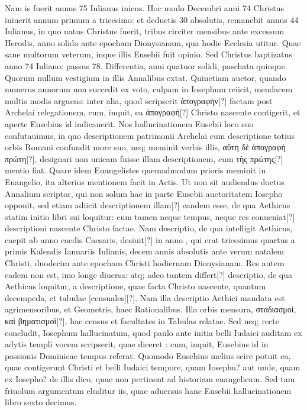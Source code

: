Nam is fuerit annus 75 Iulianus iniens.
Hoc modo Decembri anni 74 Christus iniuerit annum primum a tricesimo: et
deductis 30 absolutis, remanebit annus 44 Iulianus, in quo natus
Christus fuerit, tribus circiter mensibus ante excessum Herodis, anno
solido ante epocham Dionysianam, qua hodie Ecclesia utitur.
Quae sane multorum veterum, inque illis Eusebii fuit opinio.
Sed
Christus baptizatus anno 74 Iuliano: passus 78.
Differentia, anni
quatuor solidi, paschata quinque.
Quorum nullum vestigium in illis
Annalibus extat.
Quinetiam auctor, quando numerus annorum
non succedit ex voto, culpam in Iosephum reiicit, mendacem multis
modis arguens: inter alia, quod scripserit \textgreek{ἀπογραφὴν[?]} factam post
Archelai relegationem, cum, inquit, ea \textgreek{ἀπογραφὴ[?]} Christo nascente
contigerit, et aperte Eusebius id indicauerit.
Nos hallucinationem
Eusebii loco suo confutauimus, in quo descriptionem patrimonii
Archelai cum descriptione totius orbis Romani confundit more
suo, neq; meminit verbis illis, \textgreek{αὕτη δὲ ἀπογραφὴ πρώτη[?]},
 designari non
unicam fuisse illam descriptionem, cum \textgreek{τὴς πρώτης[?]} mentio fiat.
Quare
idem Euangelistes quemadmodum prioris meminit in Euangelio,
ita alterius mentionem facit in Actis.
Ut non sit audiendus doctus Annalium
scriptor, qui non solum hac in parte Eusebii auctoritatem
Iosepho opponit, sed etiam adiicit descriptionem illam[?] eandem esse,
de qua Aethicus statim initio libri sui loquitur: cum tamen neque
tempus, neque res conueniat[?] descriptioni nascente Christo factae.
Nam descriptio, de qua intelligit Aethicus, caepit ab anno caedis
Caesaris, desiuit[?] in anno ,
 qui erat tricesimus quartus a primis
Kalendis Ianuariis Iulianis, decem annis absolutis ante verum
natalem Christi, duodecim ante epocham Christi hodiernam Dionysianam.
Res autem eadem non est, imo longe diuersa: atq; adeo
tantem differt[?] descriptio, de qua Aethicus loquitur, a descriptione,
quae facta Christo nascente, quantum decempeda, et tabulae [censuales][?].
Nam illa descriptio Aethici mandata est agrimensoribus, et
Geometris, haec Rationalibus.
Illa orbis mensura, \textgreek{σταδιασμοὶ, καὶ βηματισμοὶ[?]},
hac census et facultates in Tabulas relatae.
Sed neq; recte concludit,
Iosephum hallucinatum, quod paulo ante initia belli Iudaici
auditam ex adytis templi vocem scripserit, quae diceret : cum, inquit, Eusebius id in passionis Dominicae tempus
referat.
Quomodo Eusebius melius scire potuit ea, quae contigerunt
Christi et belli Iudaici tempore, quam Iosephu? aut unde,
quam ex Iosepho? de illis dico, quae non pertinent ad historiam euangelicam.
Sed tam friuolum argumentum eluditur iis, quae aduersus
hanc Eusebii hallucinationem libro sexto decimus.


